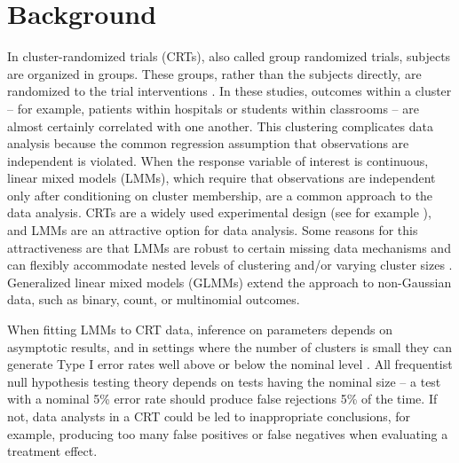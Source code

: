 \documentclass[twocolumn]{bmcart}%
\begin{document}


\section*{Background}



In cluster-randomized trials (CRTs), also called group randomized trials, subjects are organized in groups. These groups, rather than the subjects directly, are randomized to the trial interventions \cite{hayes_cluster_2017}. In these studies, outcomes within a cluster -- for example, patients within hospitals or students within classrooms -- are almost certainly correlated with one another. This clustering complicates data analysis because the common regression assumption that observations are independent is violated. When the response variable of interest is continuous, linear mixed models (LMMs), which require that observations are independent only after conditioning on cluster membership, are a common approach to the data analysis. CRTs are a widely used experimental design (see for example \cite{moon_effect_2017, vinereanu_multifaceted_2017, huang_targeted_2013}), and LMMs are an attractive option for data analysis. Some reasons for this attractiveness are that LMMs are robust to certain missing data mechanisms and can flexibly accommodate nested levels of clustering and/or varying cluster sizes \cite{fitzmaurice_applied_2012}. Generalized linear mixed models (GLMMs) extend the approach to non-Gaussian data, such as binary, count, or multinomial outcomes.

When fitting LMMs to CRT data, inference on parameters depends on asymptotic results, and in settings where the number of clusters is small they can generate Type I error rates well above or below the nominal level \cite{pinheiro_mixed-effects_2009}. All frequentist null hypothesis testing theory depends on tests having the nominal size -- a test with a nominal 5\% error rate should produce false rejections 5\% of the time. If not, data analysts in a CRT could be led to inappropriate conclusions, for example, producing too many false positives or false negatives when evaluating a treatment effect.
\end{document}
